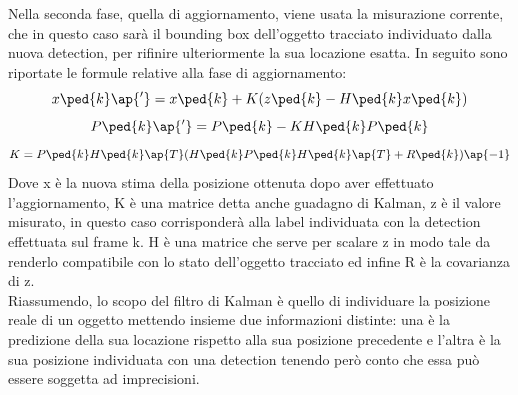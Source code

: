 Nella seconda fase, quella di aggiornamento, viene usata la misurazione corrente, che in questo caso sarà il bounding box dell'oggetto tracciato individuato dalla nuova detection, per rifinire ulteriormente la sua locazione esatta. In seguito sono riportate le formule relative alla fase di aggiornamento:
\[
    x\ped{k}\ap{'} = x\ped{k} + K(z\ped{k}-H\ped{k}x\ped{k})
\]
\[
    P\ped{k}\ap{'} = P\ped{k} - KH\ped{k}P\ped{k}
\]
\[
	K = P\ped{k}H\ped{k}\ap{T}(H\ped{k}P\ped{k}H\ped{k}\ap{T} + R\ped{k})\ap{-1}
\]
Dove x è la nuova stima della posizione ottenuta dopo aver effettuato l'aggiornamento, K è una matrice detta anche guadagno di Kalman, z è il valore misurato, in questo caso corrisponderà alla label individuata con la detection effettuata sul frame k. H è una matrice che serve per scalare z in modo tale da renderlo compatibile con lo stato dell'oggetto tracciato ed infine R è la covarianza di z.\\ Riassumendo, lo scopo del filtro di Kalman è quello di individuare la posizione reale di un oggetto mettendo insieme due informazioni distinte: una è la predizione della sua locazione rispetto alla sua posizione precedente e l'altra è la sua posizione individuata con una detection tenendo però conto che essa può essere soggetta ad imprecisioni.
